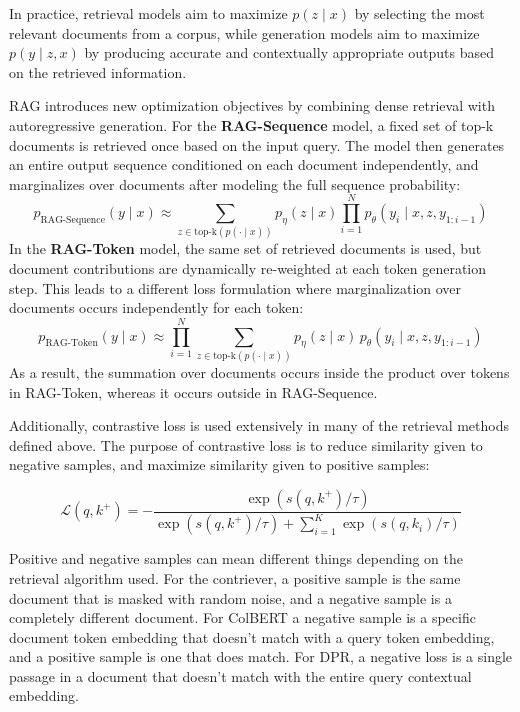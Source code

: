 \documentclass[twocolumn, 10pt]{article}
\begin{document}
In practice, retrieval models aim to maximize \( p(z \mid x) \) by selecting the most relevant documents from a corpus, while generation models aim to maximize \( p(y \mid z, x) \) by producing accurate and contextually appropriate outputs based on the retrieved information.

RAG introduces new optimization objectives by combining dense retrieval with autoregressive generation.  
For the \textbf{RAG-Sequence} model, a fixed set of top-k documents is retrieved once based on the input query. The model then generates an entire output sequence conditioned on each document independently, and marginalizes over documents after modeling the full sequence probability:
\begin{equation*}
p_{\text{RAG-Sequence}}(y \mid x) \approx \sum_{z \in \text{top-k}(p(\cdot \mid x))} p_{\eta}(z \mid x) \prod_{i=1}^{N} p_{\theta}(y_i \mid x, z, y_{1:i-1})
\end{equation*}
In the \textbf{RAG-Token} model, the same set of retrieved documents is used, but document contributions are dynamically re-weighted at each token generation step. This leads to a different loss formulation where marginalization over documents occurs independently for each token:
\begin{equation*}
p_{\text{RAG-Token}}(y \mid x) \approx \prod_{i=1}^{N} \sum_{z \in \text{top-k}(p(\cdot \mid x))} p_{\eta}(z \mid x) \, p_{\theta}(y_i \mid x, z, y_{1:i-1})
\end{equation*}
As a result, the summation over documents occurs inside the product over tokens in RAG-Token, whereas it occurs outside in RAG-Sequence.


Additionally, contrastive loss is used extensively in many of the retrieval methods defined above. The purpose of contrastive loss is to reduce similarity given to negative samples, and maximize similarity given to positive samples:

\begin{equation*}
\mathcal{L}(q, k^+) = -\frac{ \exp\left( s(q, k^+) / \tau \right) }{ \exp\left( s(q, k^+) / \tau \right) + \sum_{i=1}^{K} \exp\left( s(q, k_i) / \tau \right) }
\end{equation*}

Positive and negative samples can mean different things depending on the retrieval algorithm used. For the contriever, a positive sample is the same document that is masked with random noise, and a negative sample is a completely different document.
For ColBERT a negative sample is a specific document token embedding that doesn't match with a query token embedding, and a positive sample is one that does match. For DPR, a negative loss is a single passage in a document that doesn't match with the entire
query contextual embedding.
\end{document}

